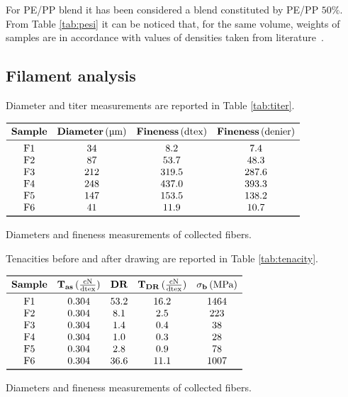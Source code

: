 \documentclass[a4paper, 11pt]{article}
\begin{document}
For PE/PP blend it has been considered a blend constituted by PE/PP $50\%$. From Table \ref{tab:pesi} it can be noticed that, for the same volume, weights of samples are in accordance with values of densities taken from literature~\cite{handbook}. 

\newpage

\subsection{Filament analysis}

Diameter and titer measurements are reported in Table \ref{tab:titer}.
\begin{table}[htp]
\centering
$
\begin{array}{cccc}
\toprule
\textbf{Sample} & \textbf{Diameter} \, (\text{µm}) & \textbf{Fineness}\, (\text{dtex}) & \textbf{Fineness} \, (\text{denier}) \\
\midrule
\text{F1} & 34 & 8.2 & 7.4 \\
\text{F2} & 87 & 53.7 & 48.3 \\ 
\text{F3} & 212 & 319.5 & 287.6 \\
\text{F4} & 248 & 437.0 & 393.3 \\
\text{F5} & 147 & 153.5 & 138.2 \\
\text{F6} & 41 & 11.9 & 10.7 \\
\bottomrule
\end{array}
$
\caption{Diameters and fineness measurements of collected fibers.}
\label{tab:titer}
\end{table}

Tenacities before and after drawing are reported in Table \ref{tab:tenacity}.
\begin{table}[htp]
\centering
$
\begin{array}{ccccc}
\toprule
\textbf{Sample} & \mathbf{T_{as}} \, (\frac{\text{cN}}{\text{dtex}}) & \textbf{DR} & \mathbf{T_{DR}}\, (\frac{\text{cN}}{\text{dtex}}) & \mathbf{\sigma_b} \, (\text{MPa})\\
\midrule
\text{F1} & 0.304 & 53.2 & 16.2 & 1464\\
\text{F2} & 0.304 & 8.1 & 2.5 & 223\\ 
\text{F3} & 0.304 & 1.4 & 0.4 & 38\\
\text{F4} & 0.304 & 1.0 & 0.3 & 28\\
\text{F5} & 0.304 & 2.8 & 0.9 & 78\\
\text{F6} & 0.304 & 36.6 & 11.1 & 1007\\
\bottomrule
\end{array}
$
\caption{Diameters and fineness measurements of collected fibers.}
\label{tab:titer}
\end{table}
\end{document}
